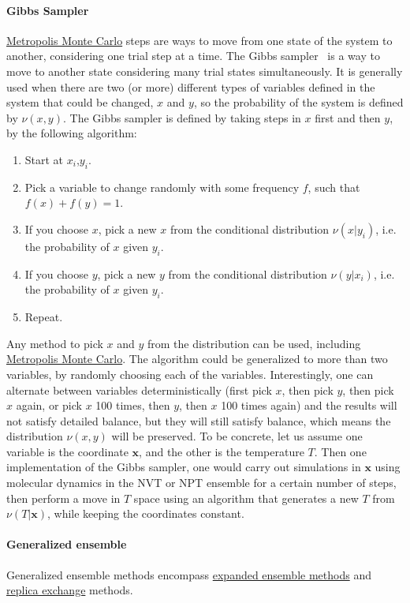 \documentclass[9pt,review]{livecoms}
\newcommand{\vx}{\mathbf{x}}
\begin{document}
\hypertarget{ref:GibbsSampler} {\paragraph{Gibbs Sampler}}
\hyperlink{ref:MetropolisMonteCarlo} {Metropolis Monte Carlo} steps are ways to move from one state of the system to another, considering one trial step at a time.  The Gibbs sampler~\cite{shirts_gibbssamp} is a  way to move to another state considering many trial states simultaneously. It is generally used when there are two (or more) different types of variables defined in the system that could be changed, $x$ and $y$, so the probability of the system is defined by $\nu(x,y)$. The Gibbs sampler is defined by taking steps in $x$ first and then $y$, by the following algorithm:
\begin{enumerate}
\item Start at $x_i$,$y_i$.
\item Pick a variable to change randomly with some frequency $f$, such that $f(x)+f(y)=1$.
\item If you choose $x$, pick a new $x$ from the conditional distribution $\nu(x|y_i)$, i.e. the probability of $x$ given $y_i$.
\item If you choose $y$, pick a new $y$ from the conditional distribution $\nu(y|x_i)$, i.e. the probability of $x$ given $y_i$.
\item Repeat.
\end{enumerate}
Any method to pick $x$ and $y$ from the distribution can be used, including \hyperlink{ref:MetropolisMonteCarlo} {Metropolis Monte Carlo}. The algorithm could be generalized to more than two variables, by randomly choosing each of the variables. Interestingly, one can alternate between variables deterministically (first pick $x$, then pick $y$, then pick $x$ again, or pick $x$ 100 times, then $y$, then $x$ 100 times again) and the results will not satisfy detailed balance, but they will still satisfy balance, which means the distribution $\nu(x,y)$ will be preserved.
To be concrete, let us assume one variable is the coordinate $\vx$, and the other is the temperature $T$. Then one implementation of the Gibbs sampler, one would carry out simulations in $\vx$ using molecular dynamics in the NVT or NPT ensemble for a certain number of steps, then perform a move in $T$ space using an algorithm that generates a new $T$ from $\nu(T|\vx)$, while keeping the coordinates constant.

\hypertarget{ref:GenEns} {\paragraph{Generalized ensemble}}
Generalized ensemble methods encompass \hyperlink{ref:ExpEns} {expanded ensemble methods} and \hyperlink{ref:ReplEx} {replica exchange} methods.
\end{document}
